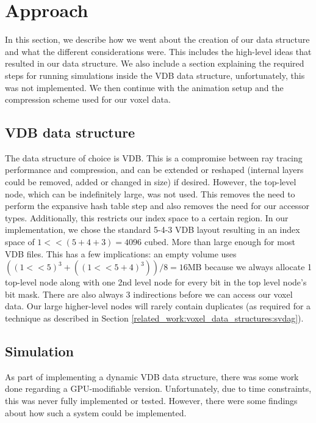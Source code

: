 \section{Approach} \label{approach}
In this section, we describe how we went about the creation of our data structure and what the different considerations were. This includes the high-level ideas that resulted in our data structure. We also include a section explaining the required steps for running simulations inside the VDB data structure, unfortunately, this was not implemented. We then continue with the animation setup and the compression scheme used for our voxel data.




\subsection{VDB data structure} \label{approach:vdb_data_structure}
The data structure of choice is VDB. This is a compromise between ray tracing performance and compression, and can be extended or reshaped (internal layers could be removed, added or changed in size) if desired. However, the top-level node, which can be indefinitely large, was not used. This removes the need to perform the expansive hash table step and also removes the need for our accessor types. Additionally, this restricts our index space to a certain region. In our implementation, we chose the standard 5-4-3 VDB layout resulting in an index space of $1 << (5+4+3) = 4096$ cubed. More than large enough for most VDB files. This has a few implications: an empty volume uses $((1<<5)^3+((1<<5+4)^3)) / 8 = 16$MB because we always allocate 1 top-level node along with one 2nd level node for every bit in the top level node's bit mask. There are also always 3 indirections before we can access our voxel data. Our large higher-level nodes will rarely contain duplicates (as required for a technique as described in Section \ref{related_work:voxel_data_structures:svdag}).

\subsection{Simulation} \label{approach:simulation}
As part of implementing a dynamic VDB data structure, there was some work done regarding a GPU-modifiable version. Unfortunately, due to time constraints, this was never fully implemented or tested. However, there were some findings about how such a system could be implemented.


